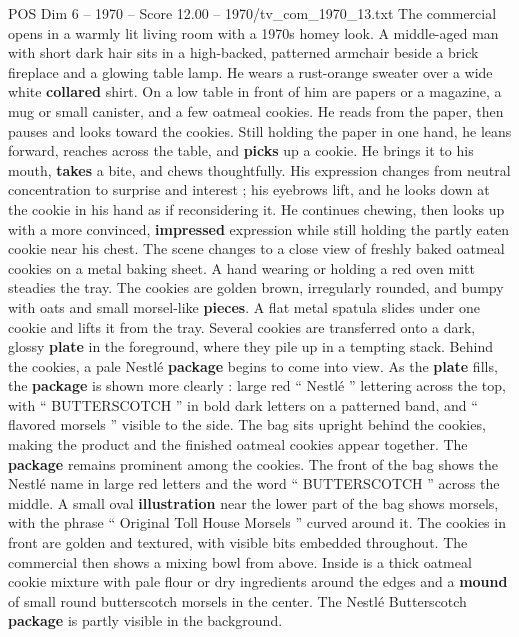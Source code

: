 \begin{textsample}{POS Dim 6 – 1970 – Score 12.00 – 1970/tv\_com\_1970\_13.txt}  \label{ex:f6_pos_041}
The commercial opens in a warmly lit living room with a 1970s homey look.
A middle-aged man with short dark hair sits in a high-backed, patterned armchair beside a brick fireplace and a glowing table lamp.
He wears a rust-orange sweater over a wide white \textbf{collared} shirt.
On a low table in front of him are papers or a magazine, a mug or small canister, and a few oatmeal cookies.
He reads from the paper, then pauses and looks toward the cookies.
Still holding the paper in one hand, he leans forward, reaches across the table, and \textbf{picks} up a cookie.
He brings it to his mouth, \textbf{takes} a bite, and chews thoughtfully.
His expression changes from neutral concentration to surprise and interest ; his eyebrows lift, and he looks down at the cookie in his hand as if reconsidering it.
He continues chewing, then looks up with a more convinced, \textbf{impressed} expression while still holding the partly eaten cookie near his chest.
The scene changes to a close view of freshly baked oatmeal cookies on a metal baking sheet.
A hand wearing or holding a red oven mitt steadies the tray.
The cookies are golden brown, irregularly rounded, and bumpy with oats and small morsel-like \textbf{pieces}.
A flat metal spatula slides under one cookie and lifts it from the tray.
Several cookies are transferred onto a dark, glossy \textbf{plate} in the foreground, where they pile up in a tempting stack.
Behind the cookies, a pale Nestlé \textbf{package} begins to come into view.
As the \textbf{plate} fills, the \textbf{package} is shown more clearly : large red “ Nestlé ” lettering across the top, with “ BUTTERSCOTCH ” in bold dark letters on a patterned band, and “ flavored morsels ” visible to the side.
The bag sits upright behind the cookies, making the product and the finished oatmeal cookies appear together.
The \textbf{package} remains prominent among the cookies.
The front of the bag shows the Nestlé name in large red letters and the word “ BUTTERSCOTCH ” across the middle.
A small oval \textbf{illustration} near the lower part of the bag shows morsels, with the phrase “ Original Toll House Morsels ” curved around it.
The cookies in front are golden and textured, with visible bits embedded throughout.
The commercial then shows a mixing bowl from above.
Inside is a thick oatmeal cookie mixture with pale flour or dry ingredients around the edges and a \textbf{mound} of small round butterscotch morsels in the center.
The Nestlé Butterscotch \textbf{package} is partly visible in the background.

\end{textsample}
